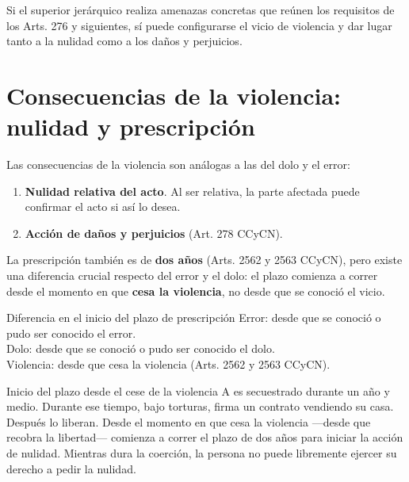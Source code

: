 \documentclass[12pt,oneside]{book}
\begin{document}
\begin{note}
Si el superior jerárquico realiza amenazas concretas que reúnen los requisitos de los Arts. 276 y siguientes, sí puede configurarse el vicio de violencia y dar lugar tanto a la nulidad como a los daños y perjuicios.
\end{note}

\section{Consecuencias de la violencia: nulidad y prescripción}

Las consecuencias de la violencia son análogas a las del dolo y el error:

\begin{enumerate}
    \item \textbf{Nulidad relativa del acto}. Al ser relativa, la parte afectada puede confirmar el acto si así lo desea.
    \item \textbf{Acción de daños y perjuicios} (Art. 278 CCyCN).
\end{enumerate}

La prescripción también es de \textbf{dos años} (Arts. 2562 y 2563 CCyCN), pero existe una diferencia crucial respecto del error y el dolo: el plazo comienza a correr desde el momento en que \textbf{cesa la violencia}, no desde que se conoció el vicio.

\begin{articulo}{Diferencia en el inicio del plazo de prescripción}
Error: desde que se conoció o pudo ser conocido el error.\\
Dolo: desde que se conoció o pudo ser conocido el dolo.\\
Violencia: desde que cesa la violencia (Arts. 2562 y 2563 CCyCN).
\end{articulo}

\begin{example}{Inicio del plazo desde el cese de la violencia}
A es secuestrado durante un año y medio. Durante ese tiempo, bajo torturas, firma un contrato vendiendo su casa. Después lo liberan. Desde el momento en que cesa la violencia ---desde que recobra la libertad--- comienza a correr el plazo de dos años para iniciar la acción de nulidad. Mientras dura la coerción, la persona no puede libremente ejercer su derecho a pedir la nulidad.
\end{example}

\end{document}
